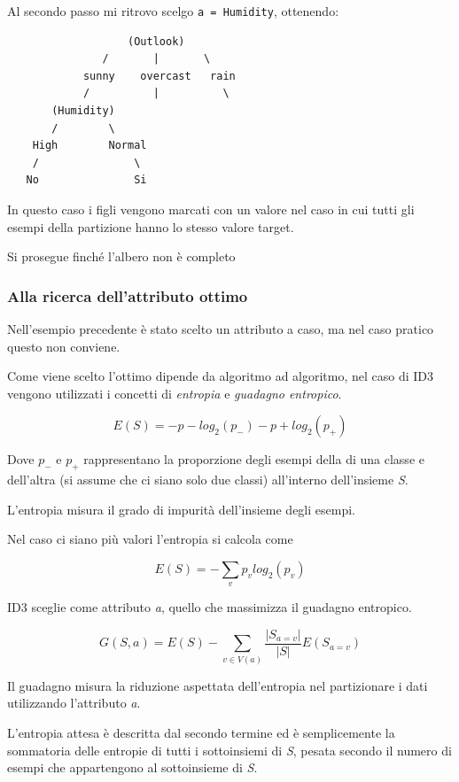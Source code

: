 Al secondo passo mi ritrovo scelgo \texttt{a\ =\ Humidity}, ottenendo:

\begin{verbatim}
                   (Outlook)
               /       |       \
            sunny    overcast   rain
            /          |          \
       (Humidity)
       /        \
    High        Normal
    /               \
   No               Si
\end{verbatim}

In questo caso i figli vengono marcati con un valore nel
caso in cui tutti gli esempi della partizione hanno lo stesso valore
target.

Si prosegue finché l'albero non è completo

\subsubsection{Alla ricerca dell'attributo ottimo}\label{alla-ricerca-dellattributo-ottimo}

Nell'esempio precedente è stato scelto un attributo a caso, ma nel caso
pratico questo non conviene.

Come viene scelto l'ottimo dipende da algoritmo ad algoritmo, nel caso
di ID3 vengono utilizzati i concetti di \emph{entropia} e \emph{guadagno
entropico}.

$$
E(S) = -p-log_2(p_-) -p+log_2(p_+)
$$

Dove $p_-$ e $p_+$ rappresentano la proporzione degli esempi della di una
classe e dell'altra (si assume che ci siano solo due classi) all'interno
dell'insieme \textit{S}.

L'entropia misura il grado di impurità dell'insieme degli esempi.

Nel caso ci siano più valori l'entropia si calcola come

$$
E(S) = - \sum_v p_vlog_2(p_v)
$$

ID3 sceglie come attributo \emph{a}, quello che massimizza il guadagno
entropico.

$$
G(S,a) = E(S) - \sum_{v \in V(a)} \frac{|S_{a = v}|}{|S|} E(S_{a=v})
$$

Il guadagno misura la riduzione aspettata dell'entropia nel partizionare
i dati utilizzando l'attributo \emph{a}.

L'entropia attesa è descritta dal secondo termine ed è semplicemente la
sommatoria delle entropie di tutti i sottoinsiemi di \emph{S}, pesata
secondo il numero di esempi che appartengono al sottoinsieme di
\emph{S}.

